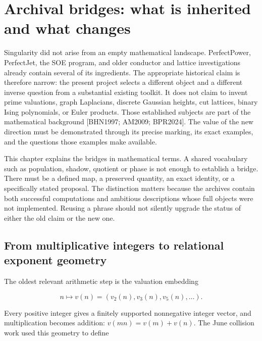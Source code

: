 \documentclass[
  11pt,
  a4paper,
]{report}
\begin{document}
\hypertarget{archival-bridges-what-is-inherited-and-what-changes}{%
\chapter{Archival bridges: what is inherited and what
changes}\label{archival-bridges-what-is-inherited-and-what-changes}}

Singularity did not arise from an empty mathematical landscape.
PerfectPower, PerfectJet, the SOE program, and older conductor and
lattice investigations already contain several of its ingredients. The
appropriate historical claim is therefore narrow: the present project
selects a different object and a different inverse question from a
substantial existing toolkit. It does not claim to invent prime
valuations, graph Laplacians, discrete Gaussian heights, cut lattices,
binary Ising polynomials, or Euler products. Those established subjects
are part of the mathematical background {[}BHN1997; AM2009; BPR2024{]}.
The value of the new direction must be demonstrated through its precise
marking, its exact examples, and the questions those examples make
available.

This chapter explains the bridges in mathematical terms. A shared
vocabulary such as population, shadow, quotient or phase is not enough
to establish a bridge. There must be a defined map, a preserved
quantity, an exact identity, or a specifically stated proposal. The
distinction matters because the archives contain both successful
computations and ambitious descriptions whose full objects were not
implemented. Reusing a phrase should not silently upgrade the status of
either the old claim or the new one.

\hypertarget{from-multiplicative-integers-to-relational-exponent-geometry}{%
\section{From multiplicative integers to relational exponent
geometry}\label{from-multiplicative-integers-to-relational-exponent-geometry}}

The oldest relevant arithmetic step is the valuation embedding

\[
n\longmapsto v(n)=(v_2(n),v_3(n),v_5(n),\ldots).
\]

Every positive integer gives a finitely supported nonnegative integer
vector, and multiplication becomes addition: \(v(mn)=v(m)+v(n)\). The
June collision work used this geometry to define
\end{document}
